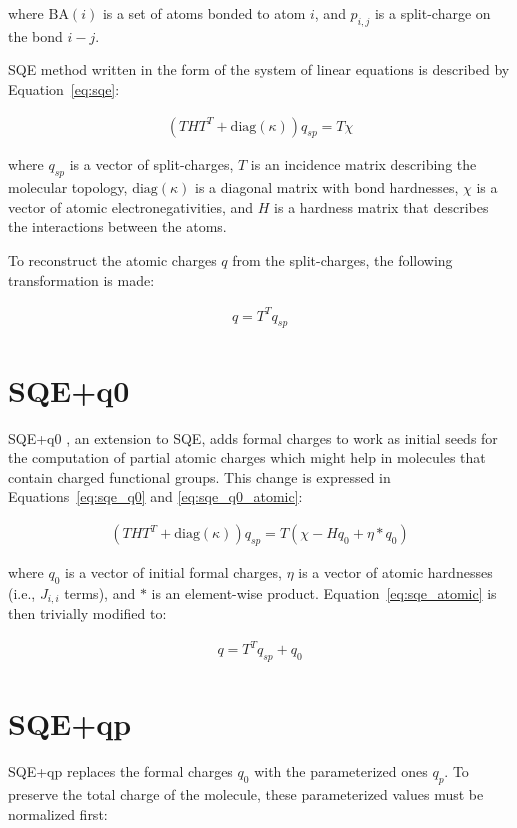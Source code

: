 \documentclass[oneside]{memoir}
\begin{document}
where $\mathrm{BA}(i)$ is a set of atoms bonded to atom $i$, and $p_{i, j}$ is a split-charge on the bond $i - j$.

SQE method written in the form of the system of linear equations is described by Equation~\ref{eq:sqe}:

\begin{gather}
    \label{eq:sqe}
    \left(THT^T + \mathrm{diag}(\kappa)\right)q_{sp} = T\chi
\end{gather}

where $q_{sp}$ is a vector of split-charges, $T$ is an incidence matrix describing the molecular topology, $\mathrm{diag}(\kappa)$ is a diagonal matrix with bond hardnesses, $\chi$ is a vector of atomic electronegativities, and $H$ is a hardness matrix that describes the interactions between the atoms.

To reconstruct the atomic charges $q$ from the split-charges, the following transformation is made:

\begin{gather}
    \label{eq:sqe_atomic}
    q = T^Tq_{sp}
\end{gather}

\section*{SQE+q0}
SQE+q0 \cite{Verstraelen2012}, an extension to SQE, adds formal charges to work as initial seeds for the computation of partial atomic charges which might help in molecules that contain charged functional groups. This change is expressed in Equations~\ref{eq:sqe_q0} and \ref{eq:sqe_q0_atomic}:

\begin{gather}
    \label{eq:sqe_q0}
    \left(THT^T + \mathrm{diag}(\kappa)\right)q_{sp} = T(\chi - Hq_0 + \eta * q_0)
\end{gather}

where $q_0$ is a vector of initial formal charges, $\eta$ is a vector of atomic hardnesses (i.e., $J_{i, i}$ terms), and $*$ is an element-wise product. Equation~\ref{eq:sqe_atomic} is then trivially modified to:

\begin{gather}
    \label{eq:sqe_q0_atomic}
    q = T^Tq_{sp} + q_0
\end{gather}

\section*{SQE+qp}
SQE+qp \cite{Schindler2021} replaces the formal charges $q_0$ with the parameterized ones $q_p$. To preserve the total charge of the molecule, these parameterized values must be normalized first:
\end{document}
